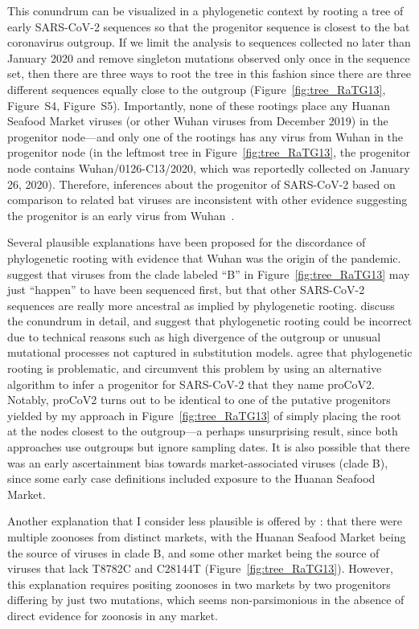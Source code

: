\documentclass[9pt,twocolumn,twoside]{gsajnl_modified}
\begin{document}
This conundrum can be visualized in a phylogenetic context by rooting a tree of early SARS-CoV-2 sequences so that the progenitor sequence is closest to the bat coronavirus outgroup.
If we limit the analysis to sequences collected no later than January 2020 and remove singleton mutations observed only once in the sequence set, then there are three ways to root the tree in this fashion since there are three different sequences equally close to the outgroup (Figure~\ref{fig:tree_RaTG13}, Figure~S4, Figure~S5).
Importantly, none of these rootings place any Huanan Seafood Market viruses (or other Wuhan viruses from December 2019) in the progenitor node---and only one of the rootings has any virus from Wuhan in the progenitor node (in the leftmost tree in Figure~\ref{fig:tree_RaTG13}, the progenitor node contains Wuhan/0126-C13/2020, which was reportedly collected on January 26, 2020).
Therefore, inferences about the progenitor of SARS-CoV-2 based on comparison to related bat viruses are inconsistent with other evidence suggesting the progenitor is an early virus from Wuhan~\citep{pipes2021assessing}.

Several plausible explanations have been proposed for the discordance of phylogenetic rooting with evidence that Wuhan was the origin of the pandemic.
\citet{rambaut2020dynamic} suggest that viruses from the clade labeled ``B'' in Figure~\ref{fig:tree_RaTG13} may just ``happen'' to have been sequenced first, but that other SARS-CoV-2 sequences are really more ancestral as implied by phylogenetic rooting.
\citet{pipes2021assessing} discuss the conundrum in detail, and suggest that phylogenetic rooting could be incorrect due to technical reasons such as high divergence of the outgroup or unusual mutational processes not captured in substitution models.
\citet{kumar2021evolutionary} agree that phylogenetic rooting is problematic, and circumvent this problem by using an alternative algorithm to infer a progenitor for SARS-CoV-2 that they name proCoV2.
Notably, proCoV2 turns out to be identical to one of the putative progenitors yielded by my approach in Figure~\ref{fig:tree_RaTG13} of simply placing the root at the nodes closest to the outgroup---a perhaps unsurprising result, since both approaches  use outgroups but ignore sampling dates.
It is also possible that there was an early ascertainment bias towards market-associated viruses (clade B), since some early case definitions included exposure to the Huanan Seafood Market.

Another explanation that I consider less plausible is offered by \citet{garry2021early}: that there were multiple zoonoses from distinct markets, with the Huanan Seafood Market being the source of viruses in clade B, and some other market being the source of viruses that lack T8782C and C28144T (Figure~\ref{fig:tree_RaTG13}).
However, this explanation requires positing zoonoses in two markets by two progenitors differing by just two mutations, which seems non-parsimonious in the absence of direct evidence for zoonosis in any market.
\end{document}
